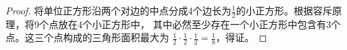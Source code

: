 \begin{proof}
    将单位正方形沿两个对边的中点分成4个边长为$\frac{1}{2}$的小正方形。根据容斥原理，将9个点放在4个小正方形中，
    其中必然至少存在一个小正方形中包含有3个点。这三个点构成的三角形面积最大为
    $\frac{1}{2}\cdot\frac{1}{2}\cdot\frac{1}{2}=\frac{1}{8}$，得证。
\end{proof}
